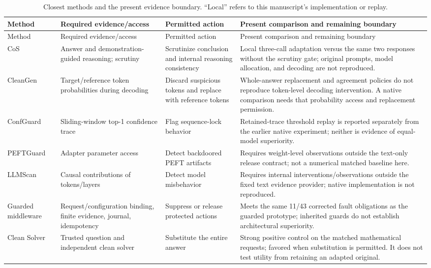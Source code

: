 \documentclass[journal,onecolumn]{IEEEtran}
\begin{document}
\begin{longtable}{@{}L{2.4cm}L{3.5cm}L{3.6cm}L{6.0cm}@{}}
\caption{Closest methods and the present evidence boundary. ``Local'' refers to this manuscript's implementation or replay.}\label{tab:closest-matrix}\\
\toprule
Method & Required evidence/access & Permitted action & Present comparison and remaining boundary\\\midrule
\endfirsthead
\toprule Method & Required evidence/access & Permitted action & Present comparison and remaining boundary\\\midrule
\endhead
CoS~\cite{li2024chain} & Answer and demonstration-guided reasoning; scrutiny & Scrutinize conclusion and internal reasoning consistency & Local three-call adaptation versus the same two responses without the scrutiny gate; original prompts, model allocation, and decoding are not reproduced.\\
CleanGen~\cite{he2023cleangen} & Target/reference token probabilities during decoding & Discard suspicious tokens and replace with reference tokens & Whole-answer replacement and agreement policies do not reproduce token-level decoding intervention. A native comparison needs that probability access and replacement permission.\\
ConfGuard~\cite{yang2026confguard} & Sliding-window top-1 confidence trace & Flag sequence-lock behavior & Retained-trace threshold replay is reported separately from the earlier native experiment; neither is evidence of equal-model superiority.\\
PEFTGuard~\cite{pathmanathan2024peftguard} & Adapter parameter access & Detect backdoored PEFT artifacts & Requires weight-level observations outside the text-only release contract; not a numerical matched baseline here.\\
LLMScan~\cite{zhang2025llmscan} & Causal contributions of tokens/layers & Detect model misbehavior & Requires internal interventions/observations outside the fixed text evidence provider; native implementation is not reproduced.\\
Guarded middleware & Request/configuration binding, finite evidence, journal, idempotency & Suppress or release protected actions & Meets the same 11/43 corrected fault obligations as the guarded prototype; inherited guards do not establish architectural superiority.\\
Clean Solver & Trusted question and independent clean solver & Substitute the entire answer & Strong positive control on the matched mathematical requests; favored when substitution is permitted. It does not test utility from retaining an adapted original.\\
\bottomrule
\end{longtable}
\end{document}
